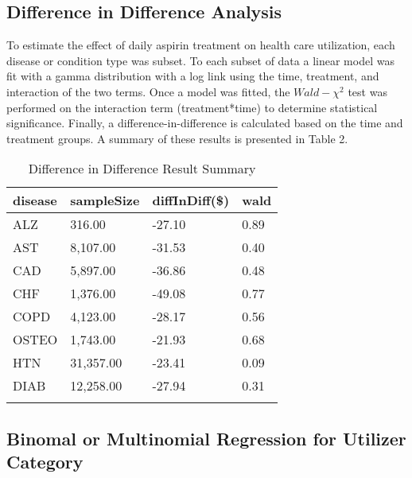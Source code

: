 \documentclass[
  english,
  man]{apa6}
\begin{document}
\hypertarget{difference-in-difference-analysis}{%
\subsection{Difference in Difference Analysis}\label{difference-in-difference-analysis}}

To estimate the effect of daily aspirin treatment on health care utilization, each disease or condition type was subset. To each subset of data a linear model was fit with a gamma distribution with a log link using the time, treatment, and interaction of the two terms. Once a model was fitted, the \(Wald-\chi^2\) test was performed on the interaction term (treatment*time) to determine statistical significance. Finally, a difference-in-difference is calculated based on the time and treatment groups. A summary of these results is presented in Table 2.

\begin{table}[tbp]

\begin{center}
\begin{threeparttable}

\caption{\label{tab:diffTable}Difference in Difference Result Summary}

\begin{tabular}{llll}
\toprule{}
disease & \multicolumn{1}{c}{sampleSize} & \multicolumn{1}{c}{diffInDiff(\$)} & \multicolumn{1}{c}{wald}\\
\midrule{}
ALZ & 316.00 & -27.10 & 0.89\\
AST & 8,107.00 & -31.53 & 0.40\\
CAD & 5,897.00 & -36.86 & 0.48\\
CHF & 1,376.00 & -49.08 & 0.77\\
COPD & 4,123.00 & -28.17 & 0.56\\
OSTEO & 1,743.00 & -21.93 & 0.68\\
HTN & 31,357.00 & -23.41 & 0.09\\
DIAB & 12,258.00 & -27.94 & 0.31\\
\bottomrule{}
\end{tabular}

\end{threeparttable}
\end{center}

\end{table}

\hypertarget{binomal-or-multinomial-regression-for-utilizer-category}{%
\subsection{Binomal or Multinomial Regression for Utilizer Category}\label{binomal-or-multinomial-regression-for-utilizer-category}}
\end{document}
